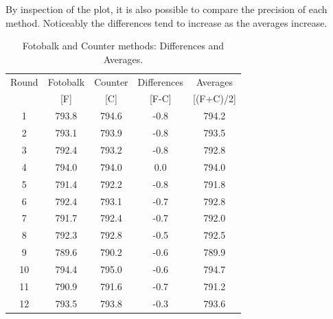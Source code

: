 \documentclass[12pt, a4paper]{report}
\theoremstyle{plain}
\theoremstyle{definition}
\theoremstyle{remark}
\begin{document}
	
	
	By inspection of the plot, it is also possible to compare the precision of each method. Noticeably the differences tend to increase as the averages increase.
	
	
	\begin{table}[h!]
		\renewcommand\arraystretch{0.7}%
		\begin{center}
			\begin{tabular}{|c||c|c||c|c|}
				\hline
				Round & Fotobalk  & Counter  & Differences  & Averages  \\
				&  [F] & [C] & [F-C] &  [(F+C)/2] \\
				\hline
				1 & 793.8 & 794.6 & -0.8 & 794.2 \\
				2 & 793.1 & 793.9 & -0.8 & 793.5 \\
				3 & 792.4 & 793.2 & -0.8 & 792.8 \\
				4 & 794.0 & 794.0 & 0.0 & 794.0 \\
				5 & 791.4 & 792.2 & -0.8 & 791.8 \\
				6 & 792.4 & 793.1 & -0.7 & 792.8 \\
				7 & 791.7 & 792.4 & -0.7 & 792.0 \\
				8 & 792.3 & 792.8 & -0.5 & 792.5 \\
				9 & 789.6 & 790.2 & -0.6 & 789.9 \\
				10 & 794.4 & 795.0 & -0.6 & 794.7 \\
				11 & 790.9 & 791.6 & -0.7 & 791.2 \\
				12 & 793.5 & 793.8 & -0.3 & 793.6 \\
				\hline
			\end{tabular}
			\caption{Fotobalk and Counter methods: Differences and Averages.}
			\label{GrubbsData1}
		\end{center}
	\end{table}
	
\end{document}
